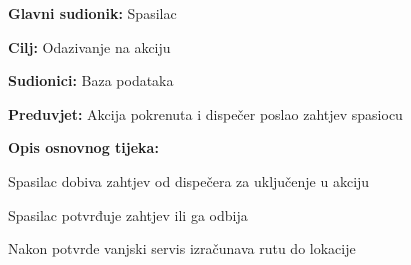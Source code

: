 					\noindent {}
					\begin{packed_item}
	
						\item \textbf{Glavni sudionik: }\text Spasilac
						\item  \textbf{Cilj:} \text Odazivanje na akciju
						\item  \textbf{Sudionici:} \text Baza podataka
						\item  \textbf{Preduvjet:} \text Akcija pokrenuta i dispečer poslao zahtjev spasiocu
						\item  \textbf{Opis osnovnog tijeka:}
						
						\item[] \begin{packed_enum}
	
							\item \text Spasilac dobiva zahtjev od dispečera za uključenje u akciju
							\item \text Spasilac potvrđuje zahtjev ili ga odbija
							\item \text Nakon potvrde vanjski servis izračunava rutu do lokacije
						\end{packed_enum}
						
					\end{packed_item}
				
